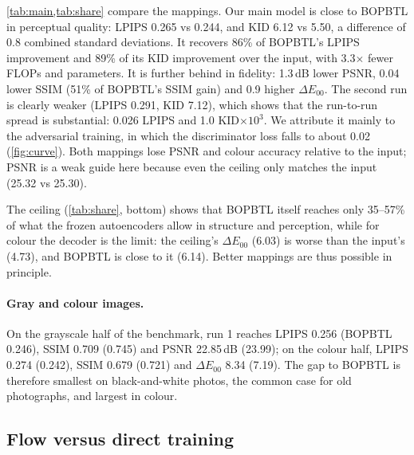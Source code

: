 \documentclass[10pt,twocolumn,letterpaper]{article}
\begin{document}
\cref{tab:main,tab:share} compare the mappings. Our main model is close to BOPBTL in perceptual quality: LPIPS 0.265 vs
0.244, and KID 6.12 vs 5.50, a difference of 0.8 combined standard deviations. It recovers 86\% of BOPBTL's LPIPS
improvement and 89\% of its KID improvement over the input, with 3.3$\times$ fewer FLOPs and parameters. It is further
behind in fidelity: 1.3\,dB lower PSNR, 0.04 lower SSIM (51\% of BOPBTL's SSIM gain) and 0.9 higher $\Delta E_{00}$.
The second run is clearly weaker (LPIPS 0.291, KID 7.12), which shows that the run-to-run spread is substantial:
0.026 LPIPS and 1.0 KID$\times10^3$. We attribute it mainly to the adversarial training, in which the discriminator loss
falls to about 0.02 (\cref{fig:curve}). Both mappings lose PSNR and colour accuracy relative to the input; PSNR is a weak
guide here because even the ceiling only matches the input (25.32 vs 25.30).

The ceiling (\cref{tab:share}, bottom) shows that BOPBTL itself reaches only 35--57\% of what the frozen autoencoders
allow in structure and perception, while for colour the decoder is the limit: the ceiling's $\Delta E_{00}$ (6.03) is
worse than the input's (4.73), and BOPBTL is close to it (6.14). Better mappings are thus possible in principle.

\paragraph{Gray and colour images.} On the grayscale half of the benchmark, run 1 reaches LPIPS 0.256 (BOPBTL 0.246),
SSIM 0.709 (0.745) and PSNR 22.85\,dB (23.99); on the colour half, LPIPS 0.274 (0.242), SSIM 0.679 (0.721) and
$\Delta E_{00}$ 8.34 (7.19). The gap to BOPBTL is therefore smallest on black-and-white photos, the common case for old
photographs, and largest in colour.

\subsection{Flow versus direct training}
\label{sec:ablation}
\end{document}
